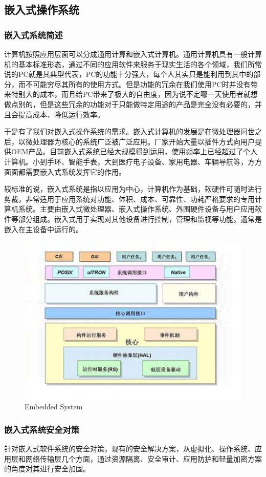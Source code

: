\documentclass[12pt, a4paper]{article}
\begin{document}
	\subsection{嵌入式操作系统}
	\subsubsection{嵌入式系统简述}
	计算机按照应用层面可以分成通用计算和嵌入式计算机。通用计算机具有一般计算机的基本标准形态，通过不同的应用软件来服务于现实生活的各个领域，我们所常说的PC就是其典型代表，PC的功能十分强大，每个人其实只是能利用到其中的部分，而不可能穷尽其所有的使用方式。但是功能的冗余在我们使用PC时并没有带来特别大的成本，而且给PC带来了极大的自由度，因为说不定哪一天使用者就想做点别的，但是这些冗余的功能对于只能做特定用途的产品是完全没有必要的，并且会提高成本、降低运行效率。  
	
	于是有了我们对嵌入式操作系统的需求。嵌入式计算机的发展是在微处理器问世之后，以微处理器为核心的系统广泛被广泛应用。厂家开始大量以插件方式向用户提供OEM产品。目前嵌入式系统已经大规模得到运用，使用频率上已经超过了个人计算机。小到手环、智能手表，大到医疗电子设备、家用电器、车辆导航等，方方面面都需要嵌入式系统发挥它的作用。  
	
	较标准的说，嵌入式系统是指以应用为中心，计算机作为基础，软硬件可随时进行剪裁，非常适用于应用系统对功能、体积、成本、可靠性、功耗严格要求的专用计算机系统。主要由嵌入式微处理器、嵌入式操作系统、外围硬件设备与用户应用软件等部分组成。嵌入式用于实现对其他设备进行控制，管理和监视等功能，通常是嵌入在主设备中运行的。
	
	\begin{figure}
		\centering
		\includegraphics[width=0.7\linewidth]{R1}
		\caption{Embedded System}
		\label{Embedded System}
	\end{figure}
	
	
	
	\subsubsection{嵌入式系统安全对策}
	针对嵌入式软件系统的安全对策，现有的安全解决方案，从虚拟化、操作系统、应用层和网络传输层几个方面，通过资源隔离、安全审计、应用防护和轻量加密方案的角度对其进行安全加固。
	
\end{document}
